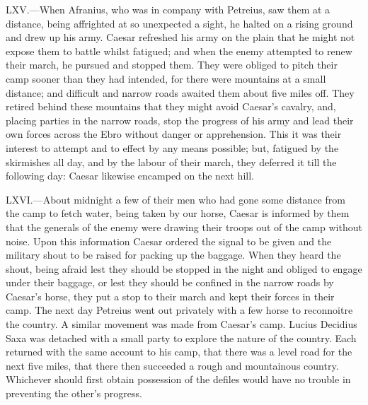 LXV.—When Afranius, who was in company with Petreius, saw them at a
distance, being affrighted at so unexpected a sight, he halted on a
rising ground and drew up his army. Caesar refreshed his army on the
plain that he might not expose them to battle whilst fatigued; and when
the enemy attempted to renew their march, he pursued and stopped them.
They were obliged to pitch their camp sooner than they had intended, for
there were mountains at a small distance; and difficult and narrow roads
awaited them about five miles off. They retired behind these mountains
that they might avoid Caesar's cavalry, and, placing parties in the
narrow roads, stop the progress of his army and lead their own forces
across the Ebro without danger or apprehension. This it was their
interest to attempt and to effect by any means possible; but, fatigued
by the skirmishes all day, and by the labour of their march, they
deferred it till the following day: Caesar likewise encamped on the next
hill.

LXVI.—About midnight a few of their men who had gone some distance from
the camp to fetch water, being taken by our horse, Caesar is informed by
them that the generals of the enemy were drawing their troops out of the
camp without noise. Upon this information Caesar ordered the signal to
be given and the military shout to be raised for packing up the baggage.
When they heard the shout, being afraid lest they should be stopped in
the night and obliged to engage under their baggage, or lest they should
be confined in the narrow roads by Caesar's horse, they put a stop to
their march and kept their forces in their camp. The next day Petreius
went out privately with a few horse to reconnoitre the country. A
similar movement was made from Caesar's camp. Lucius Decidius Saxa was
detached with a small party to explore the nature of the country. Each
returned with the same account to his camp, that there was a level road
for the next five miles, that there then succeeded a rough and
mountainous country. Whichever should first obtain possession of the
defiles would have no trouble in preventing the other's progress.


